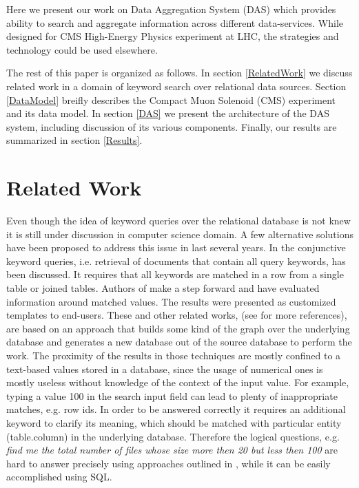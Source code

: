 \documentclass[1p,times]{elsarticle}
\begin{document}
Here we present our work on Data Aggregation System (DAS) which provides
ability to search and aggregate information across different 
data-services. While designed for CMS High-Energy Physics 
experiment at LHC, the strategies and technology could be
used elsewhere. 

The rest of this paper is organized as follows. 
In section \ref{RelatedWork} we discuss related work in a domain of 
keyword search over relational data sources.
Section \ref{DataModel} breifly describes the Compact Muon Solenoid (CMS) experiment 
and its data model. In section \ref{DAS} we present the architecture 
of the DAS system, including discussion of its
various components. Finally, our results are summarized in section \ref{Results}.

\section{Related Work\label{RelatedWork}}
Even though the idea of keyword queries over the relational database
is not knew it is still under discussion in computer science domain.
A few alternative solutions have been proposed to address this issue
in last several years. In \cite{DBXplorer} the conjunctive keyword queries,
i.e. retrieval of documents that contain all query keywords, has
been discussed. It requires that all keywords are matched in a row from a
single table or joined tables. Authors of \cite{QueryAnswer} make a step forward
and have evaluated information around matched values. The results were presented as
customized templates to end-users. 
These and other related works, (see \cite{DBXplorer, QueryAnswer} 
for more references), are based on an approach that builds some 
kind of the graph over the underlying 
database and generates a new database out of the source database to perform the work.
The proximity of the results in those techniques are mostly confined to a 
text-based values stored in a database, since the usage of numerical ones 
is mostly useless without knowledge of the context of the input value. 
For example, typing a value 100 in the search input field can lead to 
plenty of inappropriate matches, e.g. row ids. In order to be
answered correctly it requires an additional keyword to clarify its meaning, 
which should be matched with particular entity (table.column) in the 
underlying database. Therefore the logical questions, e.g.
{\it find me the total number of files whose size more then 20 but less then 
100} are hard to answer precisely using approaches outlined in \cite{DBXplorer, QueryAnswer}, 
while it can be easily accomplished using SQL. 
\end{document}
